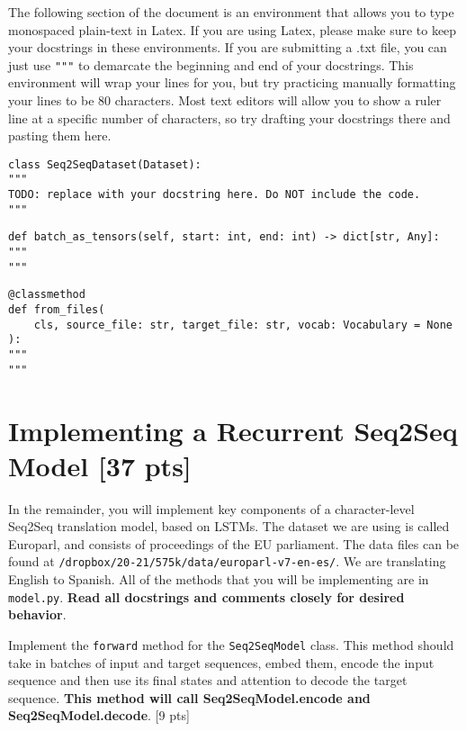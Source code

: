 \documentclass[11pt]{article}
\begin{document}
The following section of the document is an environment that allows you to type monospaced plain-text in Latex. If you are using Latex, please make sure to keep your docstrings in these environments. If you are submitting a .txt file, you can just use \texttt{"""} to demarcate the beginning and end of your docstrings. This environment will wrap your lines for you, but try practicing manually formatting your lines to be 80 characters. Most text editors will allow you to show a ruler line at a specific number of characters, so try drafting your docstrings there and pasting them here.

\begin{lstlisting}
class Seq2SeqDataset(Dataset):
"""
TODO: replace with your docstring here. Do NOT include the code.
"""
\end{lstlisting}

\begin{lstlisting}
def batch_as_tensors(self, start: int, end: int) -> dict[str, Any]:
"""
"""
\end{lstlisting}

\begin{lstlisting}
@classmethod
def from_files(
    cls, source_file: str, target_file: str, vocab: Vocabulary = None
):
"""
"""
\end{lstlisting}

\section{Implementing a Recurrent Seq2Seq Model [37 pts]}

In the remainder, you will implement key components of a character-level Seq2Seq translation model, based on LSTMs. The dataset we are using is called Europarl, and consists of proceedings of the EU parliament. The data files can be found at \texttt{/dropbox/20-21/575k/data/europarl-v7-en-es/}. We are translating English to Spanish. All of the methods that you will be implementing are in \texttt{model.py}. \textbf{Read all docstrings and comments closely for desired behavior}.

\vspace{2em}
 Implement the \texttt{forward} method for the \texttt{Seq2SeqModel} class. This method should take in batches of input and target sequences, embed them, encode the input sequence and then use its final states and attention to decode the target sequence. \textbf{This method will call Seq2SeqModel.encode and Seq2SeqModel.decode}. \hfill [9 pts]
\end{document}
